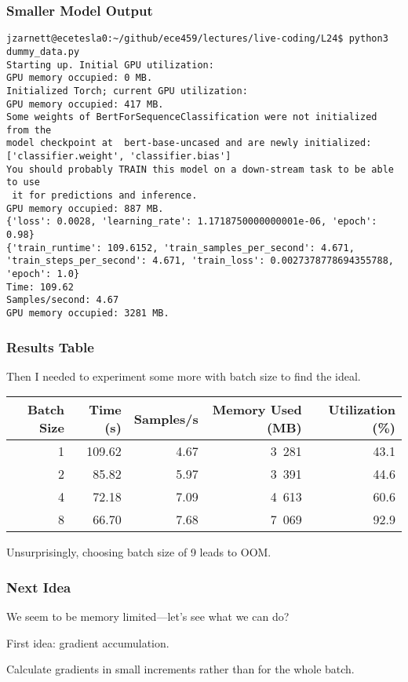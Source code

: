 \begin{frame}[fragile]
\frametitle{Smaller Model Output}

{\scriptsize
\begin{verbatim}
jzarnett@ecetesla0:~/github/ece459/lectures/live-coding/L24$ python3 dummy_data.py 
Starting up. Initial GPU utilization:
GPU memory occupied: 0 MB.
Initialized Torch; current GPU utilization:
GPU memory occupied: 417 MB.
Some weights of BertForSequenceClassification were not initialized from the 
model checkpoint at  bert-base-uncased and are newly initialized: 
['classifier.weight', 'classifier.bias']
You should probably TRAIN this model on a down-stream task to be able to use
 it for predictions and inference.
GPU memory occupied: 887 MB.
{'loss': 0.0028, 'learning_rate': 1.1718750000000001e-06, 'epoch': 0.98}
{'train_runtime': 109.6152, 'train_samples_per_second': 4.671, 
'train_steps_per_second': 4.671, 'train_loss': 0.0027378778694355788, 'epoch': 1.0}
Time: 109.62
Samples/second: 4.67
GPU memory occupied: 3281 MB.
\end{verbatim}
}

\end{frame}

\begin{frame}
\frametitle{Results Table}

Then I needed to experiment some more with batch size to find the ideal.

\begin{center}
\begin{tabular}{r|r|r|r|r}
\textbf{Batch Size} & \textbf{Time (s)} & \textbf{Samples/s} & \textbf{Memory Used (MB)} & \textbf{Utilization (\%)} \\ \hline
1 & 109.62 & 4.67 & 3~281 & 43.1 \\
2 & 85.82 & 5.97 & 3~391 & 44.6 \\
4 & 72.18 & 7.09 & 4~613 & 60.6 \\
8 & 66.70 & 7.68 & 7~069 & 92.9 \\
\end{tabular}
\end{center}

Unsurprisingly, choosing batch size of 9 leads to OOM.

\end{frame}

\begin{frame}
\frametitle{Next Idea}

We seem to be memory limited---let's see what we can do?

First idea: \alert{gradient accumulation}. 

Calculate gradients in small increments rather than for the whole batch.

\end{frame}


